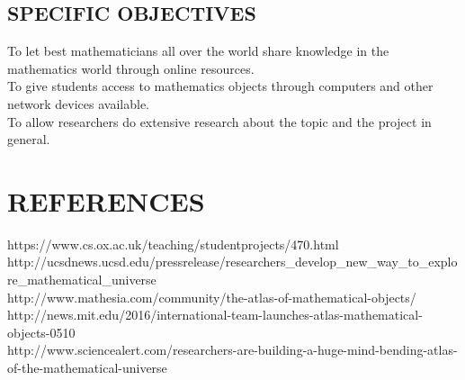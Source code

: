 \documentclass{article}
\begin{document}
\subsection{SPECIFIC OBJECTIVES}
To let best mathematicians all over the world share knowledge in the mathematics world through online resources.\\ 
To give students access to mathematics objects through computers and other network devices available.\\
To allow researchers do extensive research about the topic and the project in general.\\

\section{REFERENCES}\label{sec:intro} 
https://www.cs.ox.ac.uk/teaching/studentprojects/470.html  \\
http://ucsdnews.ucsd.edu/pressrelease/researchers_develop_new_way_to_explore_mathematical_universe \\
http://www.mathesia.com/community/the-atlas-of-mathematical-objects/ \\
http://news.mit.edu/2016/international-team-launches-atlas-mathematical-objects-0510 \\
http://www.sciencealert.com/researchers-are-building-a-huge-mind-bending-atlas-of-the-mathematical-universe \\
\end{document}
